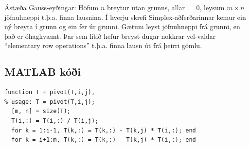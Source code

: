 \begin{aths}Ástæða Gauss-eyðingar: Höfum $n$ breytur utan grunns, allar $=0$, \mbox{leysum} $m\times n$ jöfnuhneppi t.þ.a. finna lausnina. Í hverju skrefi Simplex-aðferðarinnar kemur ein ný breyta í grunn og ein fer úr grunni. Gætum leyst jöfnuhneppi frá grunni, en það er óhagkvæmt. Þar sem lítið \mbox{hefur} breyst dugar nokkrar vel-valdar ``elementary row operations'' t.þ.a. finna lausn út frá þeirri gömlu.
 \end{aths}

\subsection*{MATLAB kóði}
\begin{lstlisting}
function T = pivot(T,i,j),
% usage: T = pivot(T,i,j);
  [m, n] = size(T);
  T(i,:) = T(i,:) / T(i,j);
  for k = 1:i-1, T(k,:) = T(k,:) - T(k,j) * T(i,:); end
  for k = i+1:m, T(k,:) = T(k,:) - T(k,j) * T(i,:); end
\end{lstlisting}


